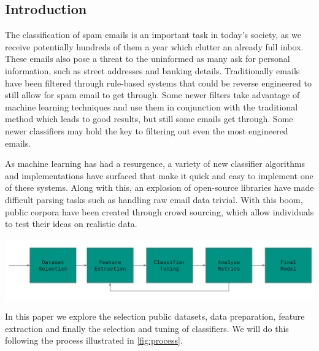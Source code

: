\documentclass[12pt]{article}
\newenvironment{Figure}
  {\par\medskip\noindent\minipage{\linewidth}}
  {\endminipage\par\medskip}
\begin{document}
    \begin{multicols}{2}
        \section{Introduction}
            The classification of spam emails is an important task in today's society,
            as we receive potentially hundreds of them a year which clutter
            an already full inbox. These emails also pose a threat to the uninformed
            as many ask for personal information, such as street addresses and banking details.
            Traditionally emails have been filtered through rule-based systems that
            could be reverse engineered to still allow for spam email to get through.
            Some newer filters take advantage of machine learning techniques and use
            them in conjunction with the traditional method which leads to good results,
            but still some emails get through. Some newer classifiers may hold the
            key to filtering out even the most engineered emails.
            
            
            As machine learning has had a resurgence, a variety
            of new classifier algorithms and implementations have surfaced that 
            make it quick and easy to implement one of these systems. Along with this,
            an explosion of open-source libraries have made difficult parsing tasks
            such as handling raw email data trivial. With this boom, public corpora
            have been created through crowd sourcing, which allow individuals to
            test their ideas on realistic data.

            \begin{Figure}
                \centering
                \includegraphics[width=\linewidth]{figures/process.png}
                \label{fig:process}
            \end{Figure}


            In this paper we explore the selection public datasets, data preparation,
            feature extraction and finally the selection and tuning of classifiers.
            We will do this following the process illustrated in \autoref{fig:process}.

\end{multicols}
\end{document}
